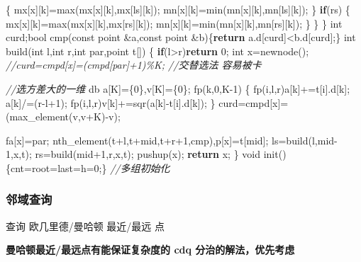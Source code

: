 \documentclass[
]{article}
\newenvironment{Shaded}{}{}
\newcommand{\AttributeTok}[1]{\textcolor[rgb]{0.49,0.56,0.16}{#1}}
\newcommand{\CommentTok}[1]{\textcolor[rgb]{0.38,0.63,0.69}{\textit{#1}}}
\newcommand{\ControlFlowTok}[1]{\textcolor[rgb]{0.00,0.44,0.13}{\textbf{#1}}}
\newcommand{\DataTypeTok}[1]{\textcolor[rgb]{0.56,0.13,0.00}{#1}}
\newcommand{\DecValTok}[1]{\textcolor[rgb]{0.25,0.63,0.44}{#1}}
\newcommand{\NormalTok}[1]{#1}
\begin{document}
\begin{Shaded}
\begin{Highlighting}[]
\NormalTok{        \{}
\NormalTok{            mx[x][k]=max(mx[x][k],mx[ls][k]);}
\NormalTok{            mn[x][k]=min(mn[x][k],mn[ls][k]);}
\NormalTok{        \}}
        \ControlFlowTok{if}\NormalTok{(rs)}
\NormalTok{        \{}
\NormalTok{            mx[x][k]=max(mx[x][k],mx[rs][k]);}
\NormalTok{            mn[x][k]=min(mn[x][k],mn[rs][k]);}
\NormalTok{        \}}
\NormalTok{    \}}
\NormalTok{\}}
\DataTypeTok{int}\NormalTok{ curd;}\DataTypeTok{bool}\NormalTok{ cmp(}\AttributeTok{const}\NormalTok{ point \&a,}\AttributeTok{const}\NormalTok{ point \&b)\{}\ControlFlowTok{return}\NormalTok{ a.d[curd]\textless{}b.d[curd];\}}
\DataTypeTok{int}\NormalTok{ build(}\DataTypeTok{int}\NormalTok{ l,}\DataTypeTok{int}\NormalTok{ r,}\DataTypeTok{int}\NormalTok{ par,point t[])}
\NormalTok{\{}
    \ControlFlowTok{if}\NormalTok{(l\textgreater{}r)}\ControlFlowTok{return} \DecValTok{0}\NormalTok{;}
    \DataTypeTok{int}\NormalTok{ x=newnode();}
    \CommentTok{//curd=cmpd[x]=(cmpd[par]+1)\%K; //交替选法 容易被卡}

    \CommentTok{//选方差大的一维}
\NormalTok{    db a[K]=\{}\DecValTok{0}\NormalTok{\},v[K]=\{}\DecValTok{0}\NormalTok{\};}
\NormalTok{    fp(k,}\DecValTok{0}\NormalTok{,K{-}}\DecValTok{1}\NormalTok{)}
\NormalTok{    \{}
\NormalTok{        fp(i,l,r)a[k]+=t[i].d[k];}
\NormalTok{        a[k]/=(r{-}l+}\DecValTok{1}\NormalTok{);}
\NormalTok{        fp(i,l,r)v[k]+=sqr(a[k]{-}t[i].d[k]);}
\NormalTok{    \}}
\NormalTok{    curd=cmpd[x]=(max\_element(v,v+K){-}v);}
    
\NormalTok{    fa[x]=par; }
\NormalTok{    nth\_element(t+l,t+mid,t+r+}\DecValTok{1}\NormalTok{,cmp),p[x]=t[mid];}
\NormalTok{    ls=build(l,mid{-}}\DecValTok{1}\NormalTok{,x,t);}
\NormalTok{    rs=build(mid+}\DecValTok{1}\NormalTok{,r,x,t);}
\NormalTok{    pushup(x);}
    \ControlFlowTok{return}\NormalTok{ x;}
\NormalTok{\}}
\DataTypeTok{void}\NormalTok{ init()\{cnt=root=last=h=}\DecValTok{0}\NormalTok{;\} }\CommentTok{//多组初始化}
\end{Highlighting}
\end{Shaded}

\hypertarget{ux90bbux57dfux67e5ux8be2}{%
\subsubsection{邻域查询}\label{ux90bbux57dfux67e5ux8be2}}

查询 欧几里德/曼哈顿 最近/最远 点

\textbf{曼哈顿最近/最远点有能保证复杂度的 cdq 分治的解法，优先考虑}
\end{document}
